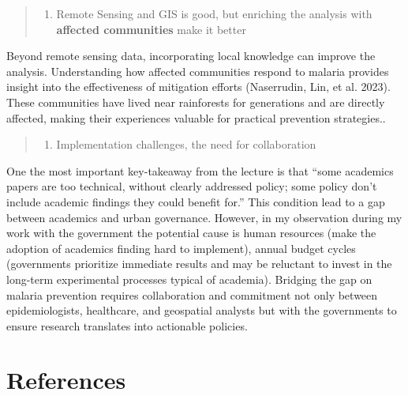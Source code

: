 \documentclass[
  letterpaper,
  DIV=11,
  numbers=noendperiod]{scrreprt}
\providecommand{\tightlist}{%
  \setlength{\itemsep}{0pt}\setlength{\parskip}{0pt}}\usepackage{longtable,booktabs,array}
\begin{document}
\begin{quote}
\begin{enumerate}
\def\labelenumi{\arabic{enumi}.}
\setcounter{enumi}{1}
\tightlist
\item
  Remote Sensing and GIS is good, but enriching the analysis with
  \textbf{affected communities} make it better
\end{enumerate}
\end{quote}

Beyond remote sensing data, incorporating local knowledge can improve
the analysis. Understanding how affected communities respond to malaria
provides insight into the effectiveness of mitigation efforts
(Naserrudin, Lin, et al. 2023). These communities have lived near
rainforests for generations and are directly affected, making their
experiences valuable for practical prevention strategies..

\begin{quote}
\begin{enumerate}
\def\labelenumi{\arabic{enumi}.}
\setcounter{enumi}{2}
\tightlist
\item
  Implementation challenges, the need for collaboration
\end{enumerate}
\end{quote}

One the most important key-takeaway from the lecture is that ``some
academics papers are too technical, without clearly addressed policy;
some policy don't include academic findings they could benefit for.''
This condition lead to a gap between academics and urban governance.
However, in my observation during my work with the government the
potential cause is human resources (make the adoption of academics
finding hard to implement), annual budget cycles (governments prioritize
immediate results and may be reluctant to invest in the long-term
experimental processes typical of academia). Bridging the gap on malaria
prevention requires collaboration and commitment not only between
epidemiologists, healthcare, and geospatial analysts but with the
governments to ensure research translates into actionable policies.

\hypertarget{references-1}{%
\section*{References}\label{references-1}}
\end{document}
